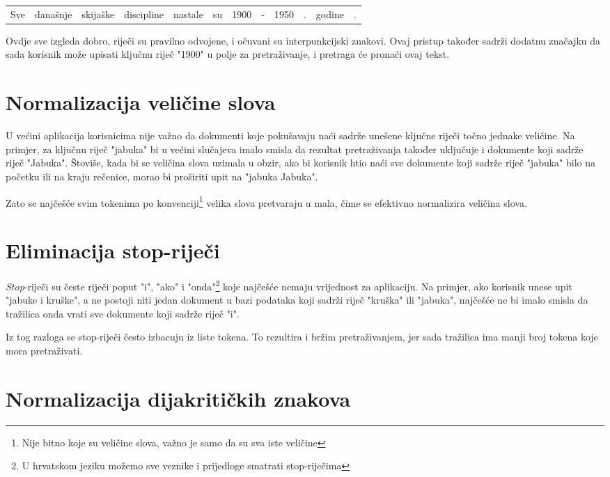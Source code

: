 \documentclass[a4paper,twoside,12pt]{memoir}
\begin{document}
\begin{center}
  \begin{tabular}{|c|c|c|c|c|c|c|c|c|c|c|c|}
    Sve & današnje & skijaške & discipline & nastale & su & 1900 & - & 1950 & . & godine & .
  \end{tabular}
\end{center}

Ovdje sve izgleda dobro, riječi su pravilno odvojene, i očuvani su interpunkcijski znakovi. Ovaj pristup također sadrži dodatnu značajku da sada korisnik može upisati ključnu riječ "1900" u polje za pretraživanje, i pretraga će pronaći ovaj tekst.

\section{Normalizacija veličine slova}

U većini aplikacija korisnicima nije važno da dokumenti koje pokušavaju naći sadrže unešene ključne riječi točno jednake veličine. Na primjer, za ključnu riječ "jabuka" bi u većini slučajeva imalo smisla da rezultat pretraživanja također uključuje i dokumente koji sadrže riječ "Jabuka". Štoviše, kada bi se veličina slova uzimala u obzir, ako bi korisnik htio naći sve dokumente koji sadrže riječ "jabuka" bilo na početku ili na kraju rečenice, morao bi proširiti upit na "jabuka Jabuka".

Zato se najčešće svim tokenima po konvenciji\footnote{Nije bitno koje su veličine slova, važno je samo da su sva iste veličine} velika slova pretvaraju u mala, čime se efektivno normalizira veličina slova.

\section{Eliminacija stop-riječi}

\textit{Stop}-riječi su česte riječi poput "i", "ako" i "onda"\footnote{U hrvatskom jeziku možemo sve veznike i prijedloge smatrati stop-riječima} koje najčešće nemaju vrijednost za aplikaciju. Na primjer, ako korisnik unese upit "jabuke i kruške", a ne postoji niti jedan dokument u bazi podataka koji sadrži riječ "kruška" ili "jabuka", najčešće ne bi imalo smisla da tražilica onda vrati sve dokumente koji sadrže riječ "i".

Iz tog razloga se stop-riječi često izbacuju iz liste tokena. To rezultira i bržim pretraživanjem, jer sada tražilica ima manji broj tokena koje mora pretraživati.

\section{Normalizacija dijakritičkih znakova}
\end{document}
